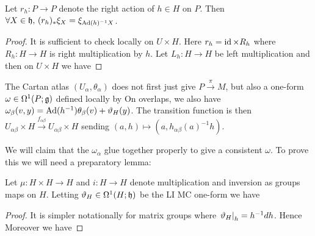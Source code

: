 \documentclass{article}
\begin{document}
\begin{lemma}
	Let $r_h : P \to  P$ denote the right action of $h \in H$ on $P$. Then $\forall X \in \mathfrak{h}, \, (r_h)_\ast \xi_X = \xi_{\operatorname{Ad}(h)^{-1}X}$. 
\end{lemma}
\begin{proof}
	It is sufficient to check locally on $U \times H$. Here $r_h = \operatorname{id} \times R_h$ where $R_h : H \to H$ is right multiplication by $h$. Let $L_h : H \to H$ be left multiplication and then on $U \times H$ we have 
\end{proof}

The Cartan atlas $(U_\alpha,\theta_\alpha)$ does not first just give $P \overset{\pi}{\to} M$, but also a one-form $\omega \in \Omega^1(P;\mathfrak{g})$ defined locally by 
On overlaps, we also have $\omega_\beta(v,y) = \operatorname{Ad}(h^{-1}) \theta_\beta(v) + \vartheta_H(y)$. The transition function is then $U_{\alpha\beta} \times H \overset{f_{\alpha\beta}}{\to} U_{\alpha\beta} \times H$ sending $(a,h) \mapsto (a,h_{\alpha\beta}(a)^{-1}h)$. 

We will claim that the $\omega_\alpha$ glue together properly to give a consistent $\omega$. To prove this we will need a preparatory lemma: 

\begin{lemma}
	Let $\mu: H \times H \to H$ and $i: H \to H$ denote multiplication and inversion as groups maps on $H$. Letting $\vartheta_H \in \Omega^1(H;\mathfrak{h})$ be the LI MC one-form we have 
\end{lemma}
\begin{proof}
	It is simpler notationally for matrix groups where $\left. \vartheta_H \right\rvert_{h} = h^{-1}dh$. Hence 
	Moreover we have 
\end{proof}
\end{document}
